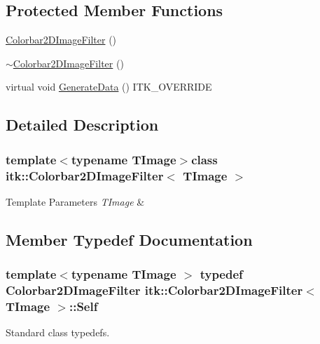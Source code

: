 \subsection*{Protected Member Functions}
\begin{DoxyCompactItemize}
\item 
\hyperlink{classitk_1_1_colorbar2_d_image_filter_ae103d71eaad083a9303743ee0789457f}{Colorbar2\-D\-Image\-Filter} ()
\item 
\hyperlink{classitk_1_1_colorbar2_d_image_filter_ae2fca5a6a90a6d3dc4ab6f1ae569be9c}{$\sim$\-Colorbar2\-D\-Image\-Filter} ()
\item 
virtual void \hyperlink{classitk_1_1_colorbar2_d_image_filter_aeddf7656f339c33f2412bc222db4d558}{Generate\-Data} () I\-T\-K\-\_\-\-O\-V\-E\-R\-R\-I\-D\-E
\end{DoxyCompactItemize}


\subsection{Detailed Description}
\subsubsection*{template$<$typename T\-Image$>$class itk\-::\-Colorbar2\-D\-Image\-Filter$<$ T\-Image $>$}


\begin{DoxyTemplParams}{Template Parameters}
{\em T\-Image} & \\
\hline
\end{DoxyTemplParams}


\subsection{Member Typedef Documentation}
\hypertarget{classitk_1_1_colorbar2_d_image_filter_a2c93d9d0cfe2be77c3f86bf7c9526c34}{
\subsubsection[{Self}]{\setlength{\rightskip}{0pt plus 5cm}template$<$typename T\-Image $>$ typedef {\bf Colorbar2\-D\-Image\-Filter} {\bf itk\-::\-Colorbar2\-D\-Image\-Filter}$<$ T\-Image $>$\-::{\bf Self}}}\label{classitk_1_1_colorbar2_d_image_filter_a2c93d9d0cfe2be77c3f86bf7c9526c34}
Standard class typedefs. 

